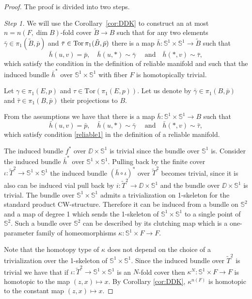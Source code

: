 \documentclass{amsart}
\begin{document}
\begin{proof} The proof is divided into two steps.

\noindent\textit{Step 1.} 
We will use the Corollary~\ref{cor:DDK} 
to construct 
an at most $n=n(F,\dim B)$-fold cover $\widetilde B\to B$ 
such that for any two elements $\bar\gamma\in \pi_1(\tilde B,\bar p)$ and $\bar\tau\in \operatorname{Tor} \pi_1(\tilde B,\bar p)$ there is a map 
$\bar h\colon \mathbb{S}^1\times \mathbb{S}^1\to \tilde B$ such that 
$$\bar h(u,v)=\bar p,\quad
\bar h(u,*)\sim\bar\gamma\quad\text{ and}\quad
\bar h(*,v)\sim\bar\tau,$$
which satisfy the condition in the  definition of reliable manifold and such that the induced bundle $\bar h^*$ over $\mathbb{S}^1\times \mathbb{S}^1$ with  fiber $F$ is homotopically trivial.

Let $\gamma\in \pi_1(E,p)$ and $\tau\in \mathrm{Tor}(\pi_1(E,p))$. 
Let us denote by $\bar\gamma\in \pi_1(B,\bar p)$ and 
$\bar\tau\in \pi_1(B,\bar p)$ their projections to $B$.

From the assumptions we have 
that there is a map 
$\bar h\colon \mathbb{S}^1\times \mathbb{S}^1\to B$ such that 
$$\bar h(u,v)=\bar p,\quad
\bar h(u,*)\sim\bar\gamma\quad\text{ and}\quad
\bar h(*,v)\sim\bar\tau,$$
which satisfy condition \eqref{reliable1} in the definition of a reliable manifold.

The  induced bundle $f^*$ over $\DD\times \mathbb{S}^1$ 
is trivial since the bundle over $\mathbb{S}^1$ is. 
Consider the  induced bundle $\bar h^*$ over $\mathbb{S}^1\times \mathbb{S}^1$. 
Pulling back by the finite cover $\iota\colon \tilde T^2\to \mathbb{S}^1\times \mathbb{S}^1$ the induced bundle 
$(\bar h \circ \iota)^*$ over $\tilde T^2$ becomes trivial, since it is also can be induced vial pull back by $i\colon \tilde T^2\to \DD\times \mathbb{S}^1$ and the bundle over $ \DD\times \mathbb{S}^1$ is trivial. 
The bundle over $\mathbb{S}^1\times \mathbb{S}^1$ admits a trivialization on 1-skeleton 
for the standard  product CW-structure. 
Therefore it can be induced from a bundle on $\mathbb{S}^2$ and a map of degree 1 
which sends the  1-skeleton of $\mathbb{S}^1\times \mathbb{S}^1$ to a single point of $\mathbb{S}^2$. 
Such a bundle over $\mathbb{S}^2$ can be described by its clutching map which is a one-parameter family of homeomorphisms 
$\kappa\colon \mathbb{S}^1\times F\to F$.

Note that the  homotopy type of $\kappa$ does not depend on the choice of a
trivialization over the 1-skeleton of $\mathbb{S}^1\times \mathbb{S}^1$.
Since the induced bundle over $\tilde T^2$ is trivial we have that 
if $ \iota\colon  \tilde T^2\to \mathbb{S}^1\times \mathbb{S}^1$ is an $N$-fold cover then 
$\kappa^N\colon \mathbb{S}^1\times F\to F$ is homotopic to the map $(z,x)\mapsto x$.
By Corollary \ref{cor:DDK},  $\kappa^{n(F)}$ 
is homotopic to the constant map $(z,x)\mapsto x$.


\end{proof}
\end{document}
